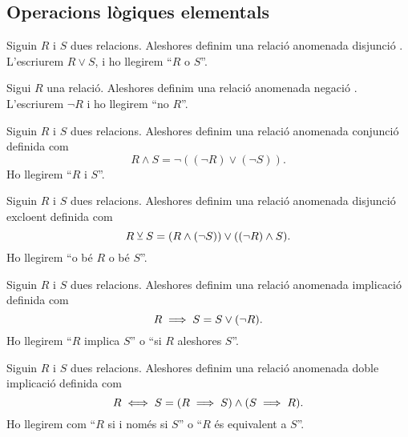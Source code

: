 \documentclass[../../Main.tex]{subfiles}
\begin{document}
	\subsection{Operacions lògiques elementals}
	\begin{definition}[Disjunció]
		\label{def:disjunció}
		Siguin \(R\) i \(S\) dues relacions. Aleshores definim una relació anomenada disjunció%
		. L'escriurem \(R\lor S\), i ho llegirem ``\(R\) o \(S\)''.
	\end{definition}
	\begin{definition}[Negació]
		\label{def:negació}
		Sigui \(R\) una relació. Aleshores definim una relació anomenada negació%
		. L'escriurem \(\lnot R\) i ho llegirem ``no \(R\)''.
	\end{definition}
	\begin{definition}[Conjunció]
		\label{def:conjunció}
		Siguin \(R\) i \(S\) dues relacions. Aleshores definim una relació anomenada conjunció definida com
		\[R\land S=\lnot((\lnot R)\lor(\lnot S)).\]
		Ho llegirem ``\(R\) i \(S\)''.
	\end{definition}
	\begin{definition}
		\label{def:disjunció excloent}
		Siguin \(R\) i \(S\) dues relacions. Aleshores definim una relació anomenada disjunció excloent definida com
		\[R\mathbin{\veebar} S=(R\land(\lnot S))\lor((\lnot R)\land S).\]
		Ho llegirem ``o bé \(R\) o bé \(S\)''.
	\end{definition}
	\begin{definition}[Implicació]
		\label{def:implicació}
		Siguin \(R\) i \(S\) dues relacions. Aleshores definim una relació anomenada implicació definida com
		\[R\implies S=S\lor(\lnot R).\]
		Ho llegirem ``\(R\) implica \(S\)'' o ``si \(R\) aleshores \(S\)''.
	\end{definition}
	\begin{definition}
		\label{def:doble implicació}
		Siguin \(R\) i \(S\) dues relacions. Aleshores definim una relació anomenada doble implicació definida com
		\[R\iff S=(R\implies S)\land(S\implies R).\]
		Ho llegirem com ``\(R\) si i només si \(S\)'' o ``\(R\) és equivalent a \(S\)''.
	\end{definition}
\end{document}
